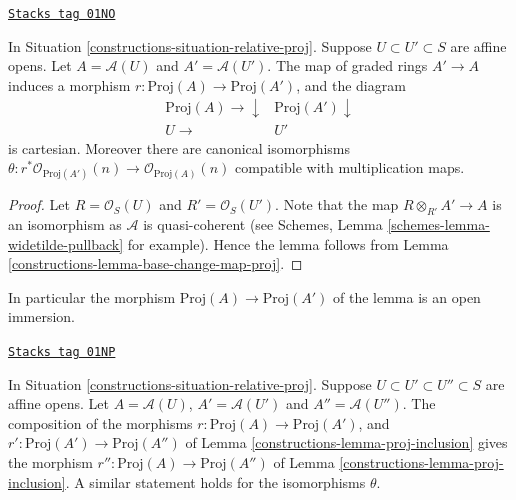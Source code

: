 \begin{lemma}
\label{constructions-lemma-proj-inclusion}
\href{https://stacks.math.columbia.edu/tag/01NO}{\texttt{Stacks tag 01NO}}

In Situation \ref{constructions-situation-relative-proj}.
Suppose $U \subset U' \subset S$ are affine opens.
Let $A = \mathcal{A}(U)$ and $A' = \mathcal{A}(U')$.
The map of graded rings $A' \to A$ induces a morphism
$r : \text{Proj}(A) \to \text{Proj}(A')$, and the diagram
$$
\begin{array}{cc}\text{Proj}(A) \longrightarrow\downarrow & \text{Proj}(A') \downarrow \\ U \longrightarrow & U'\end{array}
$$
is cartesian. Moreover there are canonical isomorphisms
$\theta : r^*\mathcal{O}_{\text{Proj}(A')}(n) \to
\mathcal{O}_{\text{Proj}(A)}(n)$ compatible with multiplication maps.
\end{lemma}

\begin{proof}

Let $R = \mathcal{O}_S(U)$ and $R' = \mathcal{O}_S(U')$.
Note that the map $R \otimes_{R'} A' \to A$ is an isomorphism as
$\mathcal{A}$ is quasi-coherent
(see Schemes, Lemma \ref{schemes-lemma-widetilde-pullback} for example).
Hence the lemma follows from
Lemma \ref{constructions-lemma-base-change-map-proj}.
\end{proof}

In particular the morphism $\text{Proj}(A) \to \text{Proj}(A')$
of the lemma is an open immersion.

\begin{lemma}
\label{constructions-lemma-transitive-proj}
\href{https://stacks.math.columbia.edu/tag/01NP}{\texttt{Stacks tag 01NP}}

In Situation \ref{constructions-situation-relative-proj}.
Suppose $U \subset U' \subset U'' \subset S$ are affine opens.
Let $A = \mathcal{A}(U)$, $A' = \mathcal{A}(U')$ and $A'' = \mathcal{A}(U'')$.
The composition of the morphisms
$r : \text{Proj}(A) \to \text{Proj}(A')$, and
$r' : \text{Proj}(A') \to \text{Proj}(A'')$ of
Lemma \ref{constructions-lemma-proj-inclusion} gives the
morphism $r'' : \text{Proj}(A) \to \text{Proj}(A'')$
of Lemma \ref{constructions-lemma-proj-inclusion}. A similar statement
holds for the isomorphisms $\theta$.
\end{lemma}


